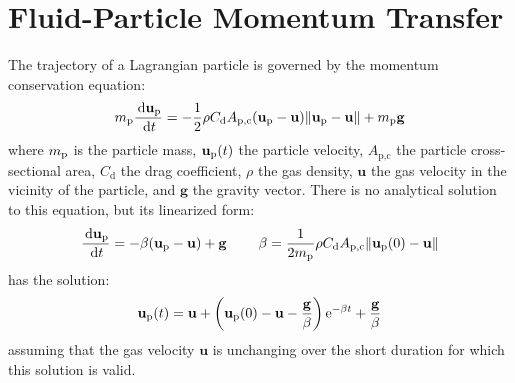 \chapter{Fluid-Particle Momentum Transfer}
\label{particle_momentum_transfer}

The trajectory of a Lagrangian particle is governed by the momentum conservation equation:
\begin{equation}
    \label{particle_eom}
    m_{\rm p} \frac{\,\mathrm{d} \mathbf{u}_{\rm p}}{\,\mathrm{d} t} = - \frac{1}{2} \rho C_\text{d} A_\text{p,c} (\mathbf{u}_{\rm p} - \mathbf{u}) \|\mathbf{u}_{\rm p} - \mathbf{u}\| + m_{\rm p} \mathbf{g}
\end{equation}
where $m_{\rm p}$ is the particle mass, $\mathbf{u}_{\rm p}(t)$ the particle velocity, $A_\text{p,c}$ the particle cross-sectional area, $C_\text{d}$ the drag coefficient, $\rho$ the gas density, $\mathbf{u}$ the gas velocity in the vicinity of the particle, and $\mathbf{g}$ the gravity vector. There is no analytical solution to this equation, but its linearized form:
\begin{equation}
   \frac{\,\mathrm{d} \mathbf{u}_{\rm p}}{\,\mathrm{d} t} = - \beta (\mathbf{u}_{\rm p} - \mathbf{u}) + \mathbf{g}  \quad \; \quad \beta = \frac{1}{2 m_{\rm p}} \rho C_\text{d} A_\text{p,c} \|\mathbf{u}_{\rm p}(0) - \mathbf{u}\|
\end{equation}
has the solution:
\begin{equation}
   \label{part_soln}
   \mathbf{u}_{\rm p}(t) = \mathbf{u} + \left( \mathbf{u}_{\rm p}(0) - \mathbf{u} - \frac{\mathbf{g}}{\beta} \right) \hbox{e}^{-\beta t} + \frac{\mathbf{g}}{\beta}
\end{equation}
assuming that the gas velocity $\mathbf{u}$ is unchanging over the short duration for which this solution is valid.

